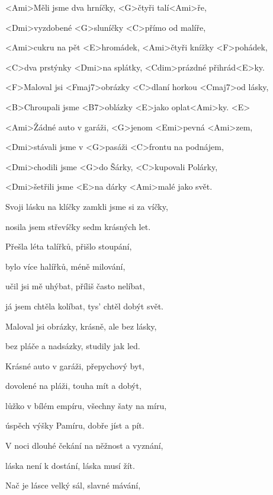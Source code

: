 

\zs
<Ami>Měli jsme dva hrníčky, <G>čtyři talí<Ami>ře,

<Dmi>vyzdobené <G>sluníčky <C>přímo od malíře,

<Ami>cukru na pět <E>hromádek, <Ami>čtyři knížky <F>pohádek,

<C>dva prstýnky <Dmi>na splátky, <Cdim>prázdné přihrád<E>ky.

\bigskip

<F>Maloval jsi <Fmaj7>obrázky <C>dlaní horkou <Cmaj7>od lásky,

<B>Chroupali jsme <B7>oblázky <E>jako oplat<Ami>ky. <E> 
\ks


\zr
<Ami>Žádné auto v garáži, <G>jenom <Emi>pevná <Ami>zem,

<Dmi>stávali jsme v <G>pasáži <C>frontu na podnájem,

<Dmi>chodili jsme <G>do Šárky, <C>kupovali Polárky,

<Dmi>šetřili jsme <E>na dárky <Ami>malé jako svět.

\bigskip

Svoji lásku na klíčky zamkli jsme si za víčky,

nosila jsem střevíčky sedm krásných let.
\kr


\zs
Přešla léta talířků, přišlo stoupání,

bylo více halířků, méně milování,

učil jsi mě uhýbat, příliš často nelíbat,

já jsem chtěla kolíbat, tys' chtěl dobýt svět.

\bigskip

Maloval jsi obrázky, krásně, ale bez lásky,

bez pláče a nadsázky, studily jak led.
\ks

\zr
Krásné auto v garáži, přepychový byt,

dovolené na pláži, touha mít a dobýt,

lůžko v bílém empíru, všechny šaty na míru,

úspěch výšky Pamíru, dobře jíst a pít.

\bigskip

V noci dlouhé čekání na něžnost a vyznání,

láska není k dostání, láska musí žít.
\kr

\zs

Nač je lásce velký sál, slavné mávání,

